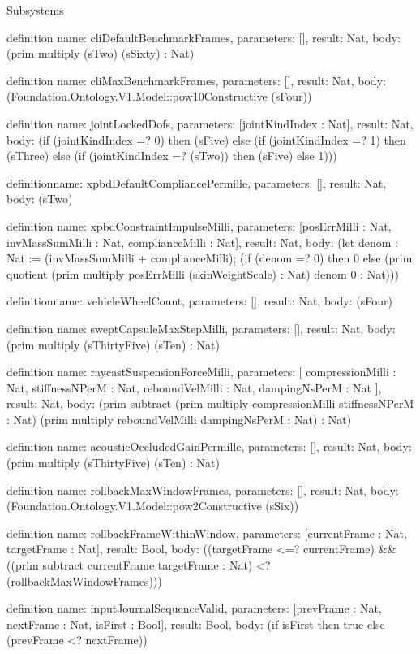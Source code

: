 \begin{lexlean}{Subsystems}
\begin{semanticmodule}
definition{
  name: cliDefaultBenchmarkFrames,
  parameters: [],
  result: Nat,
  body: (prim multiply (sTwo) (sSixty) : Nat)
}

definition{
  name: cliMaxBenchmarkFrames,
  parameters: [],
  result: Nat,
  body: (Foundation.Ontology.V1.Model::pow10Constructive (sFour))
}

definition{
  name: jointLockedDofs,
  parameters: [jointKindIndex : Nat],
  result: Nat,
  body: (if (jointKindIndex =? 0) then (sFive) else (if (jointKindIndex =? 1) then (sThree) else (if (jointKindIndex =? (sTwo)) then (sFive) else 1)))
}

definition{name: xpbdDefaultCompliancePermille, parameters: [], result: Nat, body: (sTwo)}

definition{
  name: xpbdConstraintImpulseMilli,
  parameters: [posErrMilli : Nat, invMassSumMilli : Nat, complianceMilli : Nat],
  result: Nat,
  body: (let denom : Nat := (invMassSumMilli + complianceMilli); (if (denom =? 0) then 0 else (prim quotient (prim multiply posErrMilli (skinWeightScale) : Nat) denom 0 : Nat)))
}

definition{name: vehicleWheelCount, parameters: [], result: Nat, body: (sFour)}

definition{
  name: sweptCapsuleMaxStepMilli,
  parameters: [],
  result: Nat,
  body: (prim multiply (sThirtyFive) (sTen) : Nat)
}

definition{
  name: raycastSuspensionForceMilli,
  parameters: [
    compressionMilli : Nat,
    stiffnessNPerM : Nat,
    reboundVelMilli : Nat,
    dampingNsPerM : Nat
  ],
  result: Nat,
  body: (prim subtract (prim multiply compressionMilli stiffnessNPerM : Nat) (prim multiply reboundVelMilli dampingNsPerM : Nat) : Nat)
}

definition{
  name: acousticOccludedGainPermille,
  parameters: [],
  result: Nat,
  body: (prim multiply (sThirtyFive) (sTen) : Nat)
}

definition{
  name: rollbackMaxWindowFrames,
  parameters: [],
  result: Nat,
  body: (Foundation.Ontology.V1.Model::pow2Constructive (sSix))
}

definition{
  name: rollbackFrameWithinWindow,
  parameters: [currentFrame : Nat, targetFrame : Nat],
  result: Bool,
  body: ((targetFrame <=? currentFrame) && ((prim subtract currentFrame targetFrame : Nat) <? (rollbackMaxWindowFrames)))
}

definition{
  name: inputJournalSequenceValid,
  parameters: [prevFrame : Nat, nextFrame : Nat, isFirst : Bool],
  result: Bool,
  body: (if isFirst then true else (prevFrame <? nextFrame))
}


\end{semanticmodule}
\end{lexlean}

